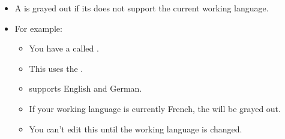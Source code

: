 

\begin{itemize}
\item A \gdsuite{} is grayed out if its \gdaut{} does not support the current working language.
\item For example:
\begin{itemize}
\item You have a \gdsuite{} called .
\item This \gdsuite{} uses the \gdaut{} .
\item {} supports English and German.
\item If your working language is currently French, the \gdsuite{}  will be grayed out. 
\item You can't edit this \gdsuite{} until the working language is changed. 
\end{itemize}
\end{itemize}
